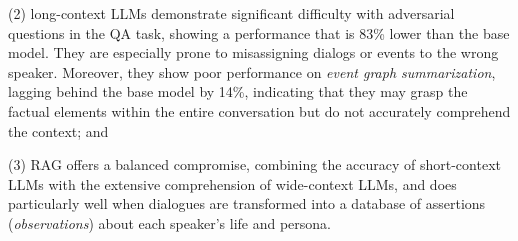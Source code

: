 (2) long-context LLMs demonstrate significant difficulty with adversarial questions in the QA task, showing a performance that is 83\% lower than the base model. They are especially prone to misassigning dialogs or events to the wrong speaker. 
Moreover, they show poor performance on \textit{event graph summarization}, lagging behind the base model by 14\%, indicating that they may grasp the factual elements within the entire conversation but do not accurately comprehend the context; and 

(3) RAG offers a balanced compromise, combining the accuracy of short-context LLMs with the extensive comprehension of wide-context LLMs, and does particularly well when dialogues are transformed into a database of assertions (\textit{observations}) about each speaker's life and persona.
